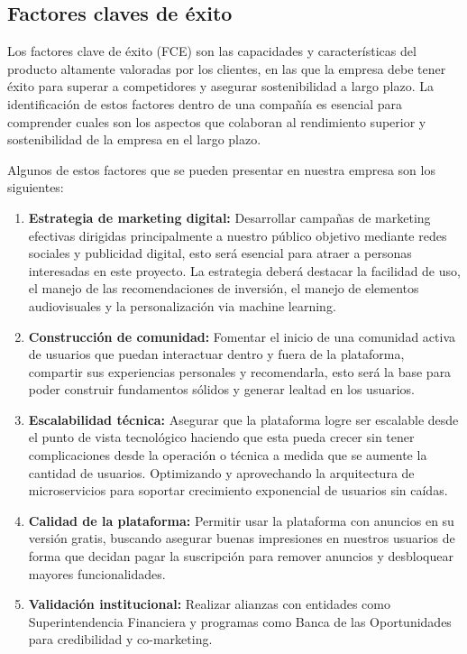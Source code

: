 {}
\subsection*{Factores claves de éxito}


Los factores clave de éxito (FCE) son las capacidades y características del producto altamente valoradas por los clientes, en las que la empresa debe tener éxito para superar a competidores y asegurar sostenibilidad a largo plazo. La identificación de estos factores dentro de una compañía es esencial para comprender cuales son los aspectos que colaboran al rendimiento superior y sostenibilidad de la empresa en el largo plazo. 

Algunos de estos factores que se pueden presentar en nuestra empresa son los siguientes:

\begin{enumerate}
	\item \textbf{Estrategia de marketing digital:} Desarrollar campañas de marketing efectivas dirigidas principalmente a nuestro público objetivo mediante redes sociales y publicidad digital, esto será esencial para atraer a personas interesadas en este proyecto. La estrategia deberá destacar la facilidad de uso, el manejo de las recomendaciones de inversión, el manejo de elementos audiovisuales y la personalización via machine learning.
	
	\item \textbf{Construcción de comunidad:} Fomentar el inicio de una comunidad activa de usuarios que puedan interactuar dentro y fuera de la plataforma, compartir sus experiencias personales y recomendarla, esto será la base para poder construir fundamentos sólidos y generar lealtad en los usuarios.
	
	\item \textbf{Escalabilidad técnica:} Asegurar que la plataforma logre ser escalable desde el punto de vista tecnológico haciendo que esta pueda crecer sin tener complicaciones desde la operación o técnica a medida que se aumente la cantidad de usuarios. Optimizando y aprovechando la arquitectura de microservicios para soportar crecimiento exponencial de usuarios sin caídas.
	
	\item \textbf{Calidad de la plataforma:} Permitir usar la plataforma con anuncios en su versión gratis, buscando asegurar buenas impresiones en nuestros usuarios de forma que decidan pagar la suscripción para remover anuncios y desbloquear mayores funcionalidades.
	
	\item \textbf{Validación institucional:} Realizar alianzas con entidades como Superintendencia Financiera y programas como Banca de las Oportunidades para credibilidad y co-marketing.
\end{enumerate}
